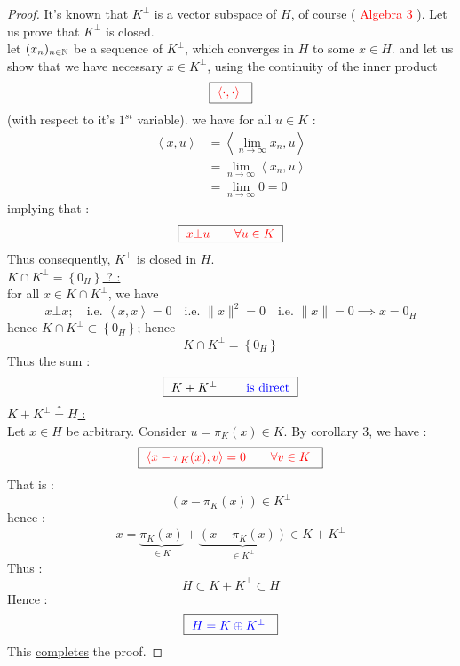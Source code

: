 % 
% 

\lecday[2025-05-29]

%  
\begin{proof}
It's known that $K^{\bot } $ is a 
\underline{
vector subspace 
} of $H $, of course ( \underline{\textcolor{red}{Algebra 3}} ). Let
us prove that $K^{\bot }$ is closed. \\
let $( x_{n} )_{n \in \mathbb{N}}  $ be a sequence of $K^{\bot } $, which
converges in $H $ to some $x \in  H $. and let 
us show that we have necessary $x \in  K^{\bot } $, using the 
continuity of the inner product 
\[
  \fbox{
    \textcolor{red}{
      $\left\langle \cdot , \cdot  \right\rangle  $ 
    }
  }
\]
(with respect to it's $1^{st} $ variable). we have for all 
$u \in  K $ : 
\begin{align*}
\left\langle 
  x, u
\right\rangle &= 
\left\langle 
  \lim_{n \to \infty} x_{n}, u
\right\rangle  \\
              &= 
              \lim_{n \to \infty} 
              \left\langle 
                x_{n}, u
              \right\rangle  \\
              &= 
              \lim_{n \to \infty}  0 = 0
\end{align*}
implying that :
\[
\fbox{
$\textcolor{red}{ x \bot  u
  \quad \quad 
\forall u \in K
} 
$
}
\]
Thus consequently, $K^{\bot } $ is closed in $H$.
\\
\underline{
  \large
\textsc{ $K \cap K^{\bot } = \left\{ 0_{H} \right\}$ ? :} 
\warning
}
\\
for all $x \in  K \cap K^{\bot } $, we have 
\[
x \bot x; \quad \text{i.e. }  
\left\langle x, x \right\rangle  = 0 \quad \text{i.e. }  
\| x \| ^2  = 0 \quad \text{i.e. }  
\| x \| = 0  \implies x = 0_{H}
\]
hence $K \cap K^{\bot } \subset \left\{ 0_{H} \right\}$; hence 
\[
K \cap K^{\bot } = \left\{ 0_{H} \right\}
\]
Thus the sum :
\[
  \fbox{
$K + K^{\bot } \quad \quad \text{ \textcolor{blue}{is direct}}$
  }
\]
\underline{
  \large
  \textsc{ $K +  K^{\bot } \overset{?}{=}  H$ :}
\warning
}
\\
Let $x \in  H $ be arbitrary. Consider $u = \pi _{K}(x)  \in  K $. 
By corollary $3 $, we have : 
\[
  \fbox{
    \textcolor{red}{
    $
\left\langle 
  x - \pi _{K}(x) , v 
\right\rangle  = 0 \quad \quad 
\forall  v \in  K$
    }
  }
\]
That is : 
\[
  (x - \pi _{K}(x) )  \in  K^{\bot }
\]
hence : 
\[
x = 
\underbrace{ 
\pi _{K}(x) 
}_{ \in K}  + 
\underbrace{
  (x - \pi _{K}(x) ) 
}_{ \in  K^{\bot }}  \in  K + K^{\bot }
\]
Thus : 
\[
H \subset K + K^{\bot } \subset H
\] 
Hence : 
\[
  \fbox{
    \textcolor{blue}{
$H = K \oplus K^{\bot }$
    }
  }
\]
This 
\underline{completes} the proof.
\end{proof}

